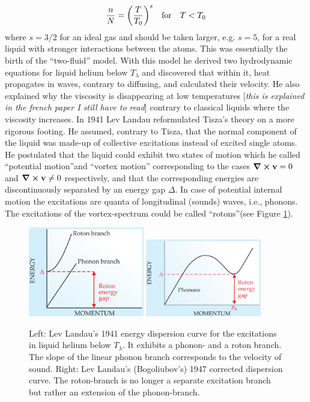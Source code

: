 \documentclass[11pt,a4paper,twoside]{article}
\renewcommand{\vec}[1]{\bm{\mathrm{#1}}}
\begin{document}
		\begin{align}
			\frac{n}{N} = \qty(\frac{T}{T_0})^s \quad \text{for} \quad T<T_0
		\end{align}
		where $s=3/2$ for an ideal gas and should be taken larger, e.g. $s=5$, for a real liquid with stronger interactions between the atoms. This was essentially the birth of the ``two-fluid'' model. With this model he derived two hydrodynamic equations for liquid helium below $T_\lambda$ and discovered that within it, heat propagates in waves, contrary to diffusing, and calculated their velocity. He also explained why the viscosity is disappearing at low temperatures [\emph{this is explained in the french paper I still have to read}] contrary to classical liquids where the viscosity increases. In 1941 Lev Landau reformulated Tisza's theory on a more rigorous footing. He assumed, contrary to Tisza, that the normal component of the liquid was made-up of collective excitations instead of excited single atoms. He postulated that the liquid could exhibit two states of motion which he called ``potential motion''and ``vortex motion'' corresponding to the cases $\curl{\vec{v}}=0$ and $\curl{\vec{v}} \neq 0$ respectively, and that the corresponding energies are discontinuously separated by an energy gap $\Delta$. In case of potential internal motion  the excitations are quanta of longitudinal (sounds) waves, i.e., phonons. The excitations of the vortex-spectrum could be called ``rotons''(see Figure \ref{fig:phonon-roton}).
		\begin{figure}
			\begin{center}
				\includegraphics[width=0.45\textwidth]{phonon-roton-landau-first}
				\includegraphics[width=0.45\textwidth]{phonon-roton-bogoliubov}
			\end{center}
			\caption{Left: Lev Landau's 1941 energy dispersion curve for the excitations in liquid helium below $T_\lambda$. It exhibits a phonon- and a roton branch. The slope of the linear phonon branch corresponds to the velocity of sound. Right: Lev Landau's (Bogoliubov's) 1947 corrected dispersion curve. The roton-branch is no longer a separate excitation branch but rather an extension of the phonon-branch.}
			\label{fig:phonon-roton}
		\end{figure}
\end{document}
